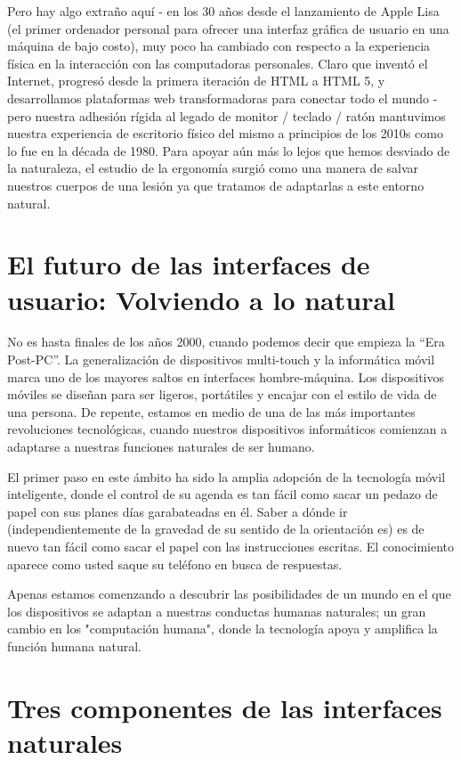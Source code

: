 Pero hay algo extraño aquí - en los 30 años desde el lanzamiento de Apple Lisa (el primer ordenador personal para ofrecer una interfaz gráfica de usuario en una máquina de bajo costo), muy poco ha cambiado con respecto a la experiencia física en la interacción con las computadoras personales. Claro que inventó el Internet, progresó desde la primera iteración de HTML a HTML 5, y desarrollamos plataformas web transformadoras para conectar todo el mundo - pero nuestra adhesión rígida al legado de monitor / teclado / ratón mantuvimos nuestra experiencia de escritorio físico del mismo a principios de los 2010s como lo fue en la década de 1980. Para apoyar aún más lo lejos que hemos desviado de la naturaleza, el estudio de la ergonomía surgió como una manera de salvar nuestros cuerpos de una lesión ya que tratamos de adaptarlas a este entorno natural.

\section{El futuro de las interfaces de usuario: Volviendo a lo natural}

No es hasta finales de los años 2000, cuando podemos decir que empieza la ``Era Post-PC''. La generalización de dispositivos multi-touch y la informática móvil marca uno de los mayores saltos en interfaces hombre-máquina. Los dispositivos móviles se diseñan para ser ligeros, portátiles y encajar con el estilo de vida de una persona. De repente, estamos en medio de una de las más importantes revoluciones tecnológicas, cuando nuestros dispositivos informáticos comienzan a adaptarse a nuestras funciones naturales de ser humano.

El primer paso en este ámbito ha sido la amplia adopción de la tecnología móvil inteligente, donde el control de su agenda es tan fácil como sacar un pedazo de papel con sus planes días garabateadas en él. Saber a dónde ir (independientemente de la gravedad de su sentido de la orientación es) es de nuevo tan fácil como sacar el papel con las instrucciones escritas. El conocimiento aparece como usted saque su teléfono en busca de respuestas.

Apenas estamos comenzando a descubrir las posibilidades de un mundo en el que los dispositivos se adaptan a nuestras conductas humanas naturales; un gran cambio en los "computación humana", donde la tecnología apoya y amplifica la función humana natural.

\section{Tres componentes de las interfaces naturales}

